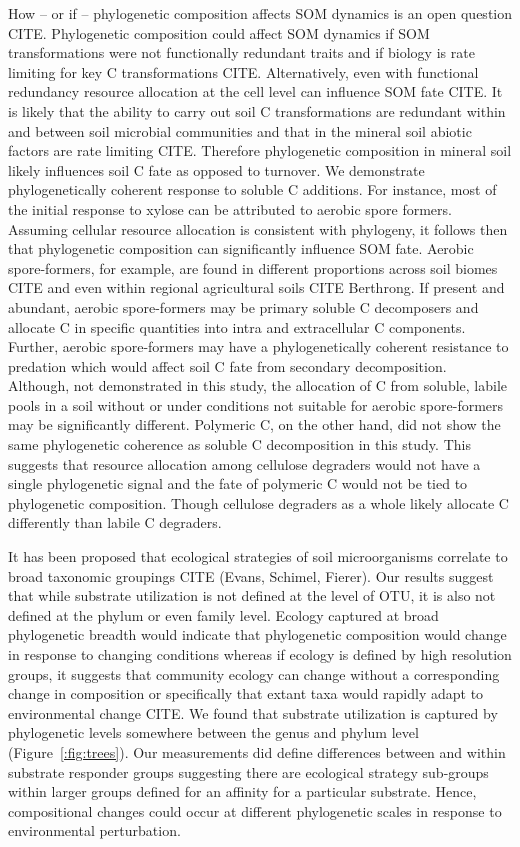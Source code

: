 How -- or if -- phylogenetic composition affects SOM dynamics is an open
question CITE. Phylogenetic composition could affect SOM dynamics if SOM
transformations were not functionally redundant traits and if biology is rate
limiting for key C transformations CITE. Alternatively, even with functional
redundancy resource allocation at the cell level can influence SOM fate CITE.
It is likely that the ability to carry out soil C transformations are redundant
within and between soil microbial communities and that in the mineral soil
abiotic factors are rate limiting CITE. Therefore phylogenetic composition in
mineral soil likely influences soil C fate as opposed to turnover. We
demonstrate phylogenetically coherent response to soluble C additions. For
instance, most of the initial response to xylose can be attributed to aerobic
spore formers. Assuming cellular resource allocation is consistent with
phylogeny, it follows then that phylogenetic composition can significantly
influence SOM fate. Aerobic spore-formers, for example, are found in different
proportions across soil biomes CITE and even within regional agricultural soils
CITE Berthrong. If present and abundant, aerobic spore-formers may be primary
soluble C decomposers and allocate C in specific quantities into intra and
extracellular C components. Further, aerobic spore-formers may have
a phylogenetically coherent resistance to predation which would affect soil
C fate from secondary decomposition. Although, not demonstrated in this study,
the allocation of C from soluble, labile pools in a soil without or under
conditions not suitable for aerobic spore-formers may be significantly
different. Polymeric C, on the other hand, did not show the same phylogenetic
coherence as soluble C decomposition in this study. This suggests that resource
allocation among cellulose degraders would not have a single phylogenetic
signal and the fate of polymeric C would not be tied to phylogenetic
composition. Though cellulose degraders as a whole likely allocate
C differently than labile C degraders.

It has been proposed that ecological strategies of soil microorganisms
correlate to broad taxonomic groupings CITE (Evans, Schimel, Fierer). Our
results suggest that while substrate utilization is not defined at the level of
OTU, it is also not defined at the phylum or even family level. Ecology
captured at broad phylogenetic breadth would indicate that phylogenetic
composition would change in response to changing conditions whereas if ecology
is defined by high resolution groups, it suggests that community ecology can
change without a corresponding change in composition or specifically that
extant taxa would rapidly adapt to environmental change CITE. We found that
substrate utilization is captured by phylogenetic levels somewhere between the
genus and phylum level (Figure~\ref{:fig:trees}). Our measurements did define
differences between and within substrate responder groups suggesting there are
ecological strategy sub-groups within larger groups defined for an affinity for
a particular substrate. Hence, compositional changes could occur at different
phylogenetic scales in response to environmental perturbation.

